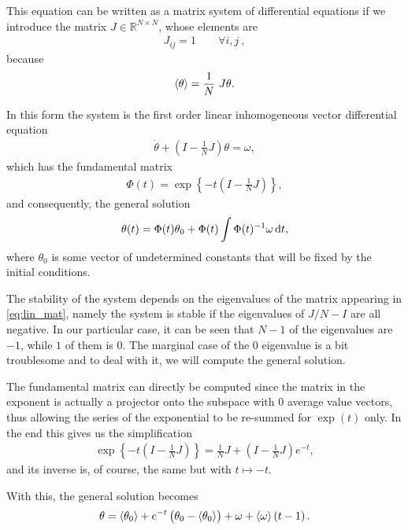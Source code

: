 \documentclass[10pt,a4paper,twocolumn]{article}
\begin{document}
This equation can be written as a matrix system of differential equations if we introduce the matrix $J \in \mathbb{R}^{N \times N}$, whose elements are
%
\begin{align}
    J_{ij} = 1 \quad \quad \forall i,j \ ,
\end{align}
%
because
%
\begin{align}
    \braket{\theta} = \frac{1}{N} \ J \theta.
\end{align}

In this form the system is the first order linear inhomogeneous vector differential equation
%
\begin{align}\label{eq:lin_mat}
    \dot{\theta} + \left(I - \frac{1}{N} J\right) \theta = \omega,
\end{align}
%
which has the fundamental matrix
%
\begin{align}
    \Phi(t) = \exp \left\lbrace-t \left(I - \frac{1}{N} J\right) \right\rbrace,
\end{align}
%
and consequently, the general solution \cite{nonhom}
%
\begin{align}
    \theta(t) = \Phi(t) \theta_0 + \Phi(t) \int \Phi(t)^{-1} \omega \dif t,
\end{align}
%
where $\theta_0$ is some vector of undetermined constants that will be fixed by the initial conditions.

The stability of the system depends on the eigenvalues of the matrix appearing in \cref{eq:lin_mat}, namely the system is stable if the eigenvalues of $J/N - I$ are all negative. In our particular case, it can be seen that $N-1$ of the eigenvalues are $-1$, while $1$ of them is $0$. The marginal case of the $0$ eigenvalue is a bit troublesome and to deal with it, we will compute the general solution.

The fundamental matrix can directly be computed since the matrix in the exponent is actually a projector onto the subspace with $0$ average value vectors, thus allowing the series of the exponential to be re-summed for $\exp(t)$ only. In the end this gives us the simplification
%
\begin{align}
    \exp \left\lbrace-t \left(I - \frac{1}{N} J\right) \right\rbrace = \frac{1}{N} J + \left(I - \frac{1}{N} J\right) e^{-t},
\end{align}
and its inverse is, of course, the same but with $t \mapsto -t$.

With this, the general solution becomes
%
\begin{align}\label{eq:linsol}
    \theta = \braket{\theta_0} + e^{-t} \left(\theta_0 - \braket{\theta_0}\right) + \omega + \braket{\omega} \left(t - 1\right).
\end{align}
\end{document}
